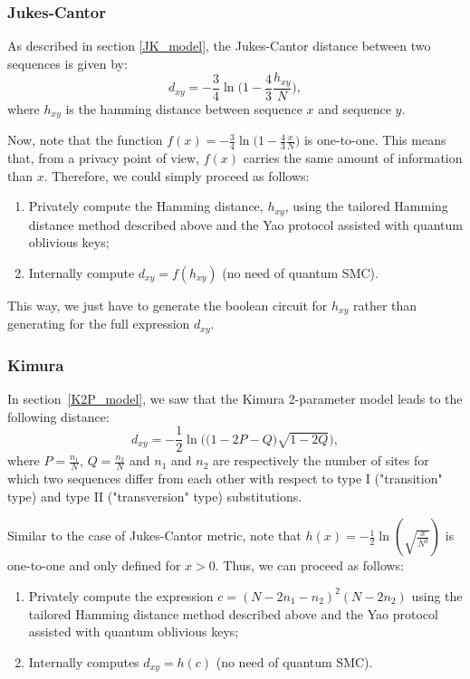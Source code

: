 \subsubsection{Jukes-Cantor} 
As described in section \ref{JK_model}, the Jukes-Cantor distance between two sequences is given by:
$$d_{xy} = -\frac{3}{4} \ln \Big(1- \frac{4}{3}\frac{h_{xy}}{N}\Big),$$
where $h_{xy}$ is the hamming distance between sequence $x$ and sequence $y$.

Now, note that the function $f(x) = -\frac{3}{4} \ln \Big(1- \frac{4}{3}\frac{x}{N}\Big)$ is one-to-one. This means that, from a privacy point of view, $f(x)$ carries the same amount of information than $x$. Therefore, we could simply proceed as follows:

\begin{enumerate}
    \item Privately compute the Hamming distance, $h_{xy}$, using the tailored Hamming distance method described above and the Yao protocol assisted with quantum oblivious keys;
    \item Internally compute $d_{xy} = f(h_{xy})$ (no need of quantum SMC).
\end{enumerate}

This way, we just have to generate the boolean circuit for $h_{xy}$ rather than generating for the full expression $d_{xy}$.


\subsubsection{Kimura}
In section~\ref{K2P_model}, we saw that the Kimura 2-parameter model leads to the following distance:
$$d_{xy} = -\frac{1}{2}\ln\bigg( \big(1-2P-Q\big) \sqrt{1-2Q} \bigg),$$
where $P=\frac{n_1}{N}$, $Q=\frac{n_2}{N}$ and $n_1$ and $n_2$ are respectively the number of sites for which two sequences differ from each other with respect to type I ("transition" type) and type II ("transversion" type) substitutions.

Similar to the case of Jukes-Cantor metric, note that $h(x) = -\frac{1}{2}\ln(\sqrt{\frac{x}{N^3}})$ is one-to-one and only defined for $x>0$. Thus, we can proceed as follows:

\begin{enumerate}
    \item Privately compute the expression $c = (N-2n_1-n_2)^2(N-2n_2)$ using the tailored Hamming distance method described above and the Yao protocol assisted with quantum oblivious keys;
    
    \item Internally computes $d_{xy} = h(c)$ (no need of quantum SMC).
\end{enumerate}

